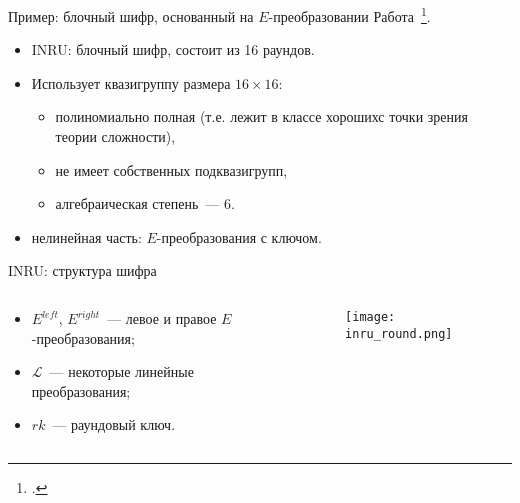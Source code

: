 \begin{frame}{Пример: блочный шифр, основанный на $E$-преобразовании}
    Работа~\footcite{inru}.
    \begin{itemize}
        \item INRU: блочный шифр, состоит из 16 раундов.
        \pause 
        \item Использует квазигруппу размера $16 \times 16$:
        \pause
        \begin{itemize}
            \item полиномиально полная (т.е. лежит в классе  \guillemotleft хороших\guillemotright с точки зрения теории сложности),
            \pause
            \item не имеет собственных подквазигрупп,
            \pause
            \item алгебраическая степень~--- 6.
        \end{itemize}
        \pause 
        \item нелинейная часть: $E$-преобразования с ключом.
    \end{itemize}
\end{frame}


\begin{frame}{INRU: структура шифра}
    \begin{columns}[T] %
        \begin{column}{.48\textwidth}
            \begin{itemize}
                \item $E^{left}$, $E^{right}$~--- левое и правое $E$-преобразования;
                \item $\mathcal{L}$~--- некоторые линейные преобразования;
                \item $rk$~--- раундовый ключ.
            \end{itemize}
        \end{column}%
        \hfill%
        \begin{column}{.48\textwidth}
            \begin{figure}[h]
                \centering 
                \texttt{[image: inru\_round.png]}
            \end{figure} 
        \end{column}%
    \end{columns}
\end{frame}


